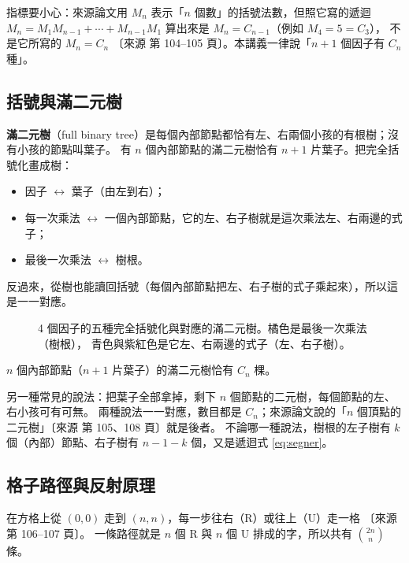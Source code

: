 \documentclass[11pt,a4paper]{article}
\newcommand{\src}[1]{{\small\color{gray!70!black}〔來源 #1〕}}  %
\begin{document}
指標要小心：來源論文用 $M_n$ 表示「$n$ 個數」的括號法數，但照它寫的遞迴
$M_n=M_1M_{n-1}+\cdots+M_{n-1}M_1$ 算出來是 $M_n=C_{n-1}$（例如 $M_4=5=C_3$），
不是它所寫的 $M_n=C_n$ \src{第 104--105 頁}。本講義一律說「$n+1$ 個因子有 $C_n$ 種」。

\subsection{括號與滿二元樹}

\textbf{滿二元樹}（full binary tree）是每個內部節點都恰有左、右兩個小孩的有根樹；沒有小孩的節點叫葉子。
有 $n$ 個內部節點的滿二元樹恰有 $n+1$ 片葉子。把完全括號化畫成樹：
\begin{itemize}
  \item 因子 $\leftrightarrow$ 葉子（由左到右）；
  \item 每一次乘法 $\leftrightarrow$ 一個內部節點，它的左、右子樹就是這次乘法左、右兩邊的式子；
  \item 最後一次乘法 $\leftrightarrow$ 樹根。
\end{itemize}
反過來，從樹也能讀回括號（每個內部節點把左、右子樹的式子乘起來），所以這是一一對應。

\begin{figure}[H]
\centering
\FigParenTrees
\caption{4 個因子的五種完全括號化與對應的滿二元樹。\textcolor{cTop}{橘色}是最後一次乘法（樹根），
\textcolor{cLeft}{青色}與\textcolor{cRight}{紫紅色}是它左、右兩邊的式子（左、右子樹）。}
\label{fig:parentrees}
\end{figure}

\begin{thmbox}[滿二元樹]
$n$ 個內部節點（$n+1$ 片葉子）的滿二元樹恰有 $C_n$ 棵。
\end{thmbox}

另一種常見的說法：把葉子全部拿掉，剩下 $n$ 個節點的二元樹，每個節點的左、右小孩可有可無。
兩種說法一一對應，數目都是 $C_n$；來源論文說的「$n$ 個頂點的二元樹」\src{第 105、108 頁}就是後者。
不論哪一種說法，樹根的左子樹有 $k$ 個（內部）節點、右子樹有 $n-1-k$ 個，又是遞迴式 \eqref{eq:segner}。

\subsection{格子路徑與反射原理}

在方格上從 $(0,0)$ 走到 $(n,n)$，每一步往右（R）或往上（U）走一格 \src{第 106--107 頁}。
一條路徑就是 $n$ 個 R 與 $n$ 個 U 排成的字，所以共有 $\binom{2n}{n}$ 條。
\end{document}
